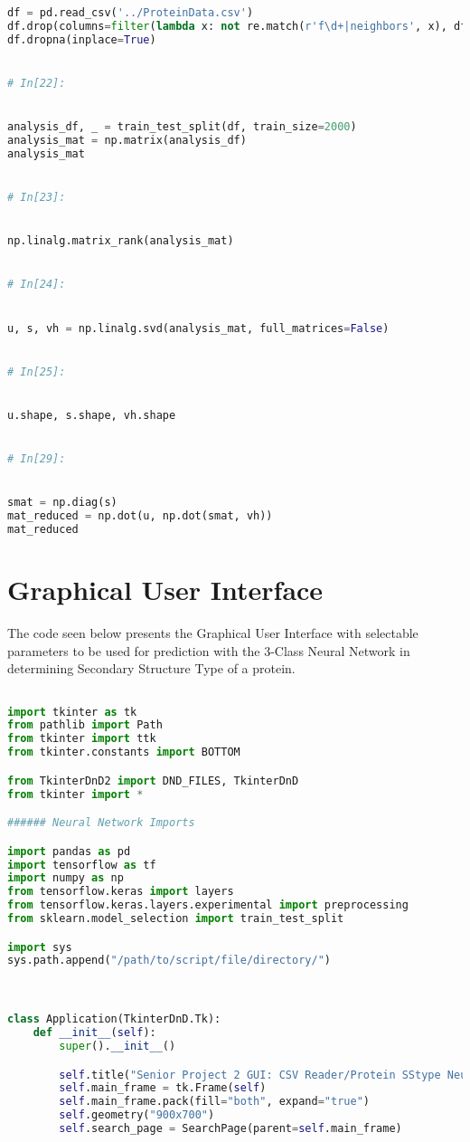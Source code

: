 \documentclass[12pt,letterpaper,oneside,reqno]{book}
\theoremstyle{plain}
\theoremstyle{definition}
\theoremstyle{plain}
\theoremstyle{remark}
\theoremstyle{plain}
\theoremstyle{definition}
\theoremstyle{plain}
\begin{document}
\begin{appendices}
\begin{lstlisting}[language=Python, label=lst:pcafull, frame=single]
df = pd.read_csv('../ProteinData.csv')
df.drop(columns=filter(lambda x: not re.match(r'f\d+|neighbors', x), df.columns), inplace=True)
df.dropna(inplace=True)


# In[22]:


analysis_df, _ = train_test_split(df, train_size=2000)
analysis_mat = np.matrix(analysis_df)
analysis_mat


# In[23]:


np.linalg.matrix_rank(analysis_mat)


# In[24]:


u, s, vh = np.linalg.svd(analysis_mat, full_matrices=False)


# In[25]:


u.shape, s.shape, vh.shape


# In[29]:


smat = np.diag(s)
mat_reduced = np.dot(u, np.dot(smat, vh))
mat_reduced


\end{lstlisting}

\section{Graphical User Interface}
The code seen below presents the Graphical User Interface with selectable parameters to be used for prediction with the 3-Class Neural Network in determining Secondary Structure Type of a protein.
\begin{lstlisting}[language=Python, label=lst:guifull, frame=single]

import tkinter as tk
from pathlib import Path
from tkinter import ttk
from tkinter.constants import BOTTOM

from TkinterDnD2 import DND_FILES, TkinterDnD
from tkinter import *

###### Neural Network Imports

import pandas as pd
import tensorflow as tf
import numpy as np
from tensorflow.keras import layers
from tensorflow.keras.layers.experimental import preprocessing
from sklearn.model_selection import train_test_split

import sys
sys.path.append("/path/to/script/file/directory/")



class Application(TkinterDnD.Tk):
    def __init__(self):
        super().__init__()

        self.title("Senior Project 2 GUI: CSV Reader/Protein SStype Neural Network Generator")
        self.main_frame = tk.Frame(self)
        self.main_frame.pack(fill="both", expand="true")
        self.geometry("900x700")
        self.search_page = SearchPage(parent=self.main_frame)
        

\end{lstlisting}
\end{appendices}
\end{document}
